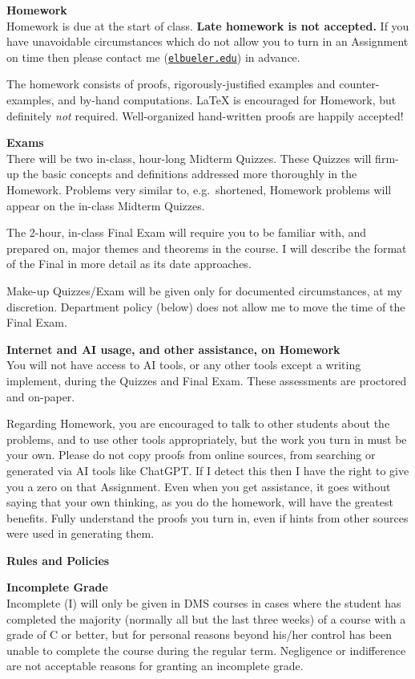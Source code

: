 \documentclass[12pt]{article}
\renewcommand{\emph}[1]{\textsf{\textbf{#1}}}
\newcommand{\localhead}[1]{\par\smallskip\textbf{#1} \smallskip\nobreak\\}%
\def\heading#1{\localhead{\large\emph{#1}}}
\def\subheading#1{\localhead{\emph{#1}}}
\begin{document}
\heading{Homework}
Homework is due at the start of class.  \emph{Late homework is not accepted.}  If you have unavoidable circumstances which do not allow you to turn in an Assignment on time then please contact me (\href{mailto:elbueler@alaska.edu}{\texttt{elbueler\@@alaska.edu}}) in advance.

The homework consists of proofs, rigorously-justified examples and counter-examples, and by-hand computations.  \LaTeX\xspace is encouraged for Homework, but definitely \textsl{not} required.  Well-organized hand-written proofs are happily accepted!


\heading{Exams}
There will be two in-class, hour-long Midterm Quizzes.  These Quizzes will firm-up the basic concepts and definitions addressed more thoroughly in the Homework.  Problems very similar to, e.g.~shortened, Homework problems will appear on the in-class Midterm Quizzes.

The 2-hour, in-class Final Exam will require you to be familiar with, and prepared on, major themes and theorems in the course.  I will describe the format of the Final in more detail as its date approaches.

Make-up Quizzes/Exam will be given only for documented circumstances, at my discretion.  Department policy (below) does not allow me to move the time of the Final Exam.

\clearpage\newpage
\phantom{foo}
\heading{Internet and AI usage, and other assistance, on Homework}
You will not have access to AI tools, or any other tools except a writing implement, during the Quizzes and Final Exam.  These assessments are proctored and on-paper.

Regarding Homework, you are encouraged to talk to other students about the problems, and to use other tools appropriately, but the work you turn in must be your own.  Please do not copy proofs from online sources, from searching or generated via AI tools like ChatGPT.   If I detect this then I have the right to give you a zero on that Assignment.  Even when you get assistance, it goes without saying that your own thinking, as you do the homework, will have the greatest benefits.  Fully understand the proofs you turn in, even if hints from other sources were used in generating them.


\phantom{foo}

\small
\heading{Rules and Policies}
\vskip -20pt

\subheading{Incomplete Grade} 
Incomplete (I) will only be given in
  DMS courses in cases where
  the student has completed the majority (normally all but the last
  three weeks) of a course with a grade of C or better, but for
  personal reasons beyond his/her control has been unable to complete
  the course during the regular term. Negligence or indifference are
  not acceptable reasons for granting an incomplete grade.
\end{document}
